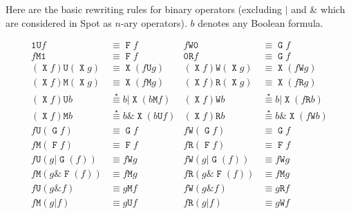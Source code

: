 \documentclass[a4paper,twoside,10pt,DIV=12]{scrreprt}
\DeclareMathOperator{\F}{\texttt{F}}
\DeclareMathOperator{\G}{\texttt{G}}
\newcommand{\U}{\mathbin{\texttt{U}}}
\newcommand{\R}{\mathbin{\texttt{R}}}
\DeclareMathOperator{\X}{\texttt{X}}
\newcommand{\M}{\mathbin{\texttt{M}}}
\newcommand{\W}{\mathbin{\texttt{W}}}
\newcommand{\OR}{\mathbin{\texttt{|}}}
\newcommand{\AND}{\mathbin{\texttt{\&}}}
\newcommand{\0}{\texttt{0}}
\newcommand{\1}{\texttt{1}}
\newcommand{\equiV}{\stackrel{\star}{\equiv}}
\begin{document}
Here are the basic rewriting rules for binary operators (excluding
$\OR$ and $\AND$ which are considered in Spot as $n$-ary operators).
$b$ denotes any Boolean formula.

\begin{align*}
  \1 \U f             & \equiv \F f            & f \W \0             & \equiv \G f            \\
  f \M \1             & \equiv \F f            & \0 \R f             & \equiv \G f            \\
  (\X f)\U (\X g)     & \equiv \X(f\U g)       & (\X f)\W(\X g)      & \equiv \X(f\W g)       \\
  (\X f)\M (\X g)     & \equiv \X(f\M g)       & (\X f)\R(\X g)      & \equiv \X(f\R g)       \\
  (\X f)\U b          & \equiV b\OR \X(b\M f)  & (\X f)\W b          & \equiV b\OR \X(f\R b)  \\
  (\X f)\M b          & \equiV b\AND \X(b\U f) & (\X f)\R b          & \equiV b\AND \X(f\W b) \\
  f \U(\G f)          & \equiv \G f            & f \W(\G f)          & \equiv \G f            \\
  f \M(\F f)          & \equiv \F f            & f \R(\F f)          & \equiv \F f            \\
  f \U (g \OR \G(f))  & \equiv f\W g           & f \W (g \OR \G(f))  & \equiv f\W g           \\
  f \M (g \AND \F(f)) & \equiv f\M g           & f \R (g \AND \F(f)) & \equiv f\M g           \\
  f \U (g \AND f)     & \equiv g\M f           & f \W (g \AND f)     & \equiv g\R f           \\
  f \M (g \OR f)      & \equiv g\U f           & f \R (g \OR f)      & \equiv g\W f
\end{align*}
\end{document}
